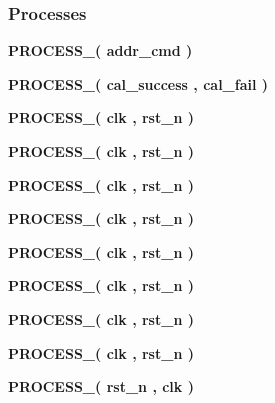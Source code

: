 \subsubsection*{Processes}
 \begin{DoxyCompactItemize}
\item 
{\bf P\+R\+O\+C\+E\+S\+S\+\_}{\bfseries  ( {\bfseries {\bfseries {\bf addr\+\_\+cmd}} \textcolor{vhdlchar}{ }} )}
\item 
{\bf P\+R\+O\+C\+E\+S\+S\+\_}{\bfseries  ( {\bfseries {\bfseries {\bf cal\+\_\+success}} \textcolor{vhdlchar}{ }} , {\bfseries {\bfseries {\bf cal\+\_\+fail}} \textcolor{vhdlchar}{ }} )}
\item 
{\bf P\+R\+O\+C\+E\+S\+S\+\_}{\bfseries  ( {\bfseries {\bfseries {\bf clk}} \textcolor{vhdlchar}{ }} , {\bfseries {\bfseries {\bf rst\+\_\+n}} \textcolor{vhdlchar}{ }} )}
\item 
{\bf P\+R\+O\+C\+E\+S\+S\+\_}{\bfseries  ( {\bfseries {\bfseries {\bf clk}} \textcolor{vhdlchar}{ }} , {\bfseries {\bfseries {\bf rst\+\_\+n}} \textcolor{vhdlchar}{ }} )}
\item 
{\bf P\+R\+O\+C\+E\+S\+S\+\_}{\bfseries  ( {\bfseries {\bfseries {\bf clk}} \textcolor{vhdlchar}{ }} , {\bfseries {\bfseries {\bf rst\+\_\+n}} \textcolor{vhdlchar}{ }} )}
\item 
{\bf P\+R\+O\+C\+E\+S\+S\+\_}{\bfseries  ( {\bfseries {\bfseries {\bf clk}} \textcolor{vhdlchar}{ }} , {\bfseries {\bfseries {\bf rst\+\_\+n}} \textcolor{vhdlchar}{ }} )}
\item 
{\bf P\+R\+O\+C\+E\+S\+S\+\_}{\bfseries  ( {\bfseries {\bfseries {\bf clk}} \textcolor{vhdlchar}{ }} , {\bfseries {\bfseries {\bf rst\+\_\+n}} \textcolor{vhdlchar}{ }} )}
\item 
{\bf P\+R\+O\+C\+E\+S\+S\+\_}{\bfseries  ( {\bfseries {\bfseries {\bf clk}} \textcolor{vhdlchar}{ }} , {\bfseries {\bfseries {\bf rst\+\_\+n}} \textcolor{vhdlchar}{ }} )}
\item 
{\bf P\+R\+O\+C\+E\+S\+S\+\_}{\bfseries  ( {\bfseries {\bfseries {\bf clk}} \textcolor{vhdlchar}{ }} , {\bfseries {\bfseries {\bf rst\+\_\+n}} \textcolor{vhdlchar}{ }} )}
\item 
{\bf P\+R\+O\+C\+E\+S\+S\+\_}{\bfseries  ( {\bfseries {\bfseries {\bf clk}} \textcolor{vhdlchar}{ }} , {\bfseries {\bfseries {\bf rst\+\_\+n}} \textcolor{vhdlchar}{ }} )}
\item 
{\bf P\+R\+O\+C\+E\+S\+S\+\_}{\bfseries  ( {\bfseries {\bfseries {\bf rst\+\_\+n}} \textcolor{vhdlchar}{ }} , {\bfseries {\bfseries {\bf clk}} \textcolor{vhdlchar}{ }} )}

\end{DoxyCompactItemize}

